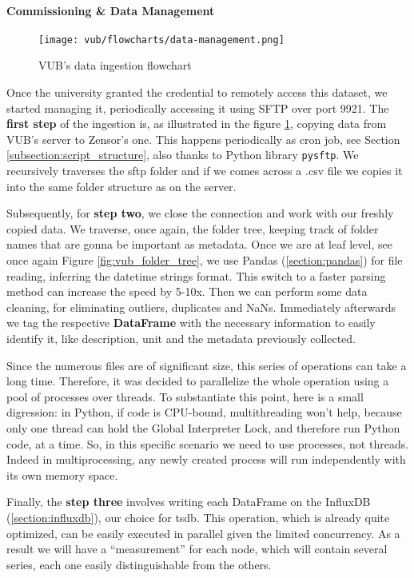 \paragraph{Commissioning \& Data Management}
\begin{figure}[ht]
    \texttt{[image: vub/flowcharts/data-management.png]}
    \caption{\ac{VUB}'s data ingestion flowchart}
    \label{fig:vub_ingestion}
\end{figure}
Once the university granted the credential to remotely access this dataset, we started managing it, periodically accessing it using \ac{SFTP} over port 9921. %
The \textbf{first step} of the ingestion is, as illustrated in the figure \ref{fig:vub_ingestion}, copying data from \ac{VUB}'s server to Zensor's one. 
This happens periodically as cron job, see Section \ref{subsection:script_structure}, also thanks to Python library \texttt{pysftp}. %
We recursively traverses the sftp folder and if we comes across a .csv file we copies it into the same folder structure as on the server.

Subsequently, for \textbf{step two}, we close the connection and work with our freshly copied data. We traverse, once again, the folder tree, keeping track of
folder names that are gonna be important as metadata. Once we are at leaf level, see once again Figure \ref{fig:vub_folder_tree}, we use 
Pandas (\ref{section:pandas}) for file reading, inferring the datetime strings format. This switch to a faster parsing method can increase the speed by 5-10x. %
Then we can perform some data cleaning, for eliminating outliers, duplicates and NaNs.
Immediately afterwards we tag the respective \textbf{DataFrame} with the necessary information to easily identify it, like description, unit and the metadata previously collected.

Since the numerous files are of significant size, this series of operations can take a long time. Therefore, it was decided to parallelize the whole operation using a pool of processes over threads.
To substantiate this point, here is a small digression: 
in Python, if code is CPU-bound, multithreading won't help, because only one thread can hold the Global Interpreter Lock, and therefore run Python code, at a time. 
So, in this specific scenario we need to use processes, not threads. Indeed in multiprocessing, any newly created process will run independently with its own memory space.

Finally, the \textbf{step three} involves writing each DataFrame on the InfluxDB (\ref*{section:influxdb}), our choice for \acl{tsdb}.
This operation, which is already quite optimized, can be easily executed in parallel given the limited concurrency.
As a result we will have a ``measurement'' for each node, which will contain several series, each one easily distinguishable from the others.

